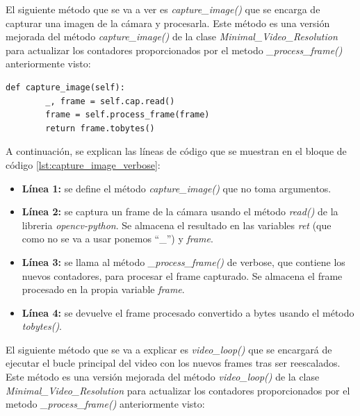 El siguiente método que se va a ver es \textit{capture\_image()} que se encarga de capturar una imagen de la cámara y procesarla. Este método es una versión mejorada del método \textit{capture\_image()} de la clase \textit{Minimal\_Video\_Resolution} para actualizar los contadores proporcionados por el metodo \textit{\_process\_frame()} anteriormente visto:
\begin{lstlisting}[style=pythonstyle, caption={Método capture\_image() de \textit{Minimal\_Video\_Resolution\_verbose}}, label={lst:capture_image_verbose}]
def capture_image(self):
        _, frame = self.cap.read()
        frame = self.process_frame(frame)
        return frame.tobytes()
\end{lstlisting}
\vspace{\baselineskip}

A continuación, se explican las líneas de código que se muestran en el bloque de código \ref{lst:capture_image_verbose}:
\begin{itemize}
    \item \textbf{Línea 1:} se define el método \textit{capture\_image()} que no toma argumentos.
    \item \textbf{Línea 2:} se captura un frame de la cámara usando el método \textit{read()} de la libreria \textit{opencv-python}. Se almacena el resultado en las variables \textit{ret} (que como no se va a usar ponemos ``\_'') y \textit{frame}.
    \item \textbf{Línea 3:} se llama al método \textit{\_process\_frame()} de verbose, que contiene los nuevos contadores, para procesar el frame capturado. Se almacena el frame procesado en la propia variable \textit{frame}.
    \item \textbf{Línea 4:} se devuelve el frame procesado convertido a bytes usando el método \textit{tobytes()}.
\end{itemize}
\vspace{\baselineskip}

El siguiente método que se va a explicar es \textit{video\_loop()} que se encargará de ejecutar el bucle principal del video con los nuevos frames tras ser reescalados. Este método es una versión mejorada del método \textit{video\_loop()} de la clase \textit{Minimal\_Video\_Resolution} para actualizar los contadores proporcionados por el metodo \textit{\_process\_frame()} anteriormente visto:

